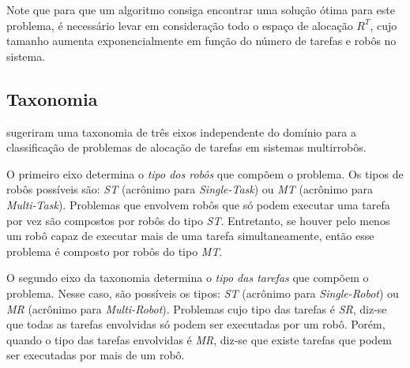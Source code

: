             Note que para que um algoritmo consiga encontrar uma solução ótima para este problema, é necessário levar em consideração todo o espaço de alocação $R^T$, cujo tamanho aumenta exponencialmente em função do número de tarefas e robôs no sistema. 
            
            
            
    
        \subsection{Taxonomia} \label{subsec:taxonomia_mrta}
             sugeriram uma taxonomia de três eixos independente do domínio para a classificação de problemas de alocação de tarefas em sistemas multirrobôs. 
            
            O primeiro eixo determina o \textit{tipo dos robôs} que compõem o problema. Os tipos de robôs possíveis são: \textit{ST} (acrônimo para \textit{Single-Task}) ou \textit{MT} (acrônimo para \textit{Multi-Task}). Problemas que envolvem robôs que só podem executar uma tarefa por vez são compostos por robôs do tipo \textit{ST}. Entretanto, se houver pelo menos um robô capaz de executar mais de uma tarefa simultaneamente, então esse problema é composto por robôs do tipo \textit{MT}. 
            
            O segundo eixo da taxonomia determina o \textit{tipo das tarefas} que compõem o problema. Nesse caso, são possíveis os tipos: \textit{ST} (acrônimo para \textit{Single-Robot}) ou \textit{MR} (acrônimo para \textit{Multi-Robot}). Problemas cujo tipo das tarefas é \textit{SR}, diz-se que todas as tarefas envolvidas só podem ser executadas por um robô. Porém, quando o tipo das tarefas envolvidas é \textit{MR}, diz-se que existe tarefas que podem ser executadas por mais de um robô.
            

